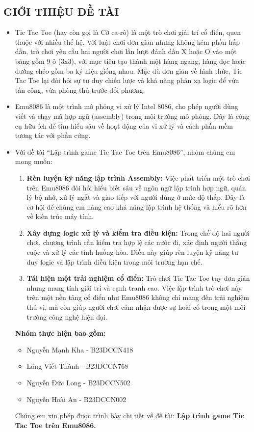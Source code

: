 \subsection*{\textbf{\Large GIỚI THIỆU ĐỀ TÀI}}
\begin{itemize}
    \item Tic Tac Toe (hay còn gọi là Cờ ca-rô) là một trò chơi giải trí cổ điển, quen thuộc với nhiều thế hệ. Với luật chơi đơn giản nhưng không kém phần hấp dẫn, trò chơi yêu cầu hai người chơi lần lượt đánh dấu X hoặc O vào một bảng gồm 9 ô (3x3), với mục tiêu tạo thành một hàng ngang, hàng dọc hoặc đường chéo gồm ba ký hiệu giống nhau. Mặc dù đơn giản về hình thức, Tic Tac Toe lại đòi hỏi sự tư duy chiến lược và khả năng phản xạ logic để vừa tấn công, vừa phòng thủ trước đối phương.
    \item Emu8086 là một trình mô phỏng vi xử lý Intel 8086, cho phép người dùng viết và chạy mã hợp ngữ (assembly) trong môi trường mô phỏng. Đây là công cụ hữu ích để tìm hiểu sâu về hoạt động của vi xử lý và cách phần mềm tương tác với phần cứng.
    \item Với đề tài “Lập trình game Tic Tac Toe trên Emu8086”, nhóm chúng em mong muốn:
    \begin{enumerate}
        \item \textbf{Rèn luyện kỹ năng lập trình Assembly: } Việc phát triển một trò chơi trên Emu8086 đòi hỏi hiểu biết sâu về ngôn ngữ lập trình hợp ngữ, quản lý bộ nhớ, xử lý ngắt và giao tiếp với người dùng ở mức độ thấp. Đây là cơ hội để chúng em nâng cao khả năng lập trình hệ thống và hiểu rõ hơn về kiến trúc máy tính.
        \item \textbf{Xây dựng logic xử lý và kiểm tra điều kiện: }Trong chế độ hai người chơi, chương trình cần kiểm tra hợp lệ các nước đi, xác định người thắng cuộc và xử lý các tình huống hòa. Điều này giúp rèn luyện kỹ năng tư duy logic và lập trình điều kiện trong môi trường hạn chế.
        \item \textbf{Tái hiện một trải nghiệm cổ điển: }Trò chơi Tic Tac Toe tuy đơn giản nhưng mang tính giải trí và cạnh tranh cao. Việc lập trình trò chơi này trên một nền tảng cổ điển như Emu8086 không chỉ mang đến trải nghiệm thú vị, mà còn giúp người chơi cảm nhận được sự hoài cổ trong một môi trường công nghệ hiện đại.
    \end{enumerate}
    \textbf{Nhóm thực hiện bao gồm:}
    \begin{itemize}
        \item Nguyễn Mạnh Kha - B23DCCN418
        \item Lăng Viết Thành - B23DCCN768
        \item Nguyễn Đức Long - B23DCCN502
        \item Nguyễn Hoài An - B23DCCN002
    \end{itemize}
    Chúng em xin phép được trình bày chi tiết về đề tài: \textbf{Lập trình game Tic Tac Toe trên Emu8086.}
\end{itemize}

